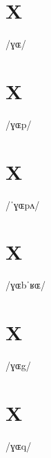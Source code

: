 \documentclass[10pt,a4paper,twoside]{book}
\begin{document}
\section*{X}

\begin{multicols}{3}
 {/ɣɶ/} {}
\end{multicols}

\section*{X}

\begin{multicols}{3}
 {/ɣɶp/} {}
\end{multicols}

\section*{X}

\begin{multicols}{3}
 {/ˈɣɶpʌ/} {}
\end{multicols}

\section*{X}

\begin{multicols}{3}
 {/ɣɶbˈʁɶ/} {}
\end{multicols}

\section*{X}

\begin{multicols}{3}
 {/ɣɶg/} {}
\end{multicols}

\section*{X}

\begin{multicols}{3}
 {/ɣɶq/} {}
\end{multicols}
\end{document}
